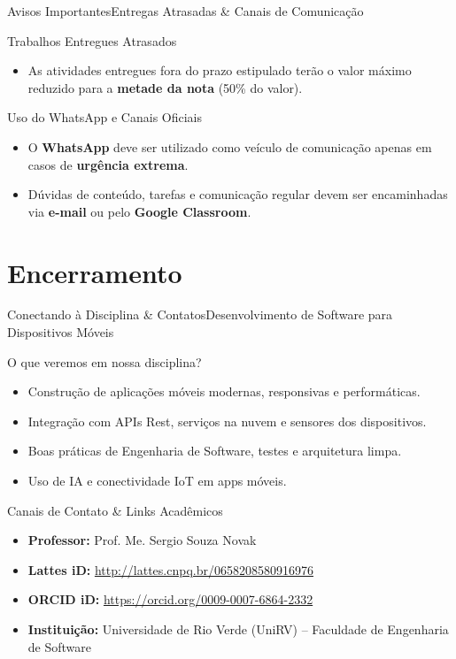 \documentclass[9pt]{beamer}
\begin{document}
\begin{frame}{Avisos Importantes}{Entregas Atrasadas \& Canais de Comunicação}
  \begin{block}{Trabalhos Entregues Atrasados}
    \begin{itemize}
      \item As atividades entregues fora do prazo estipulado terão o valor máximo reduzido para a \textbf{metade da nota} (50\% do valor).
    \end{itemize}
  \end{block}

  \begin{exampleblock}{Uso do WhatsApp e Canais Oficiais}
    \begin{itemize}
      \item O \textbf{WhatsApp} deve ser utilizado como veículo de comunicação apenas em casos de \textbf{urgência extrema}.
      \item Dúvidas de conteúdo, tarefas e comunicação regular devem ser encaminhadas via \textbf{e-mail} ou pelo \textbf{Google Classroom}.
    \end{itemize}
  \end{exampleblock}
\end{frame}

\section{Encerramento}
\begin{frame}{Conectando à Disciplina \& Contatos}{Desenvolvimento de Software para Dispositivos Móveis}
  \begin{block}{O que veremos em nossa disciplina?}
    \begin{itemize}
      \item Construção de aplicações móveis modernas, responsivas e performáticas.
      \item Integração com APIs Rest, serviços na nuvem e sensores dos dispositivos.
      \item Boas práticas de Engenharia de Software, testes e arquitetura limpa.
      \item Uso de IA e conectividade IoT em apps móveis.
    \end{itemize}
  \end{block}

  \begin{exampleblock}{Canais de Contato \& Links Acadêmicos}
    \begin{itemize}
      \item \textbf{Professor:} Prof. Me. Sergio Souza Novak
      \item \textbf{Lattes iD:} \url{http://lattes.cnpq.br/0658208580916976}
      \item \textbf{ORCID iD:} \url{https://orcid.org/0009-0007-6864-2332}
      \item \textbf{Instituição:} Universidade de Rio Verde (UniRV) -- Faculdade de Engenharia de Software
    \end{itemize}
  \end{exampleblock}
\end{frame}
\end{document}
